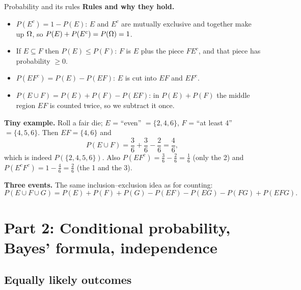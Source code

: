 \begin{key}{Probability and its rules}
	\textbf{Rules and why they hold.}
	\begin{itemize}[nosep]
		\item $P(E^c)=1-P(E)$: $E$ and $E^c$ are mutually exclusive and together
		      make up $\Omega$, so $P(E)+P(E^c)=P(\Omega)=1$.
		\item If $E\subseteq F$ then $P(E)\le P(F)$: $F$ is $E$ plus the piece
		      $FE^c$, and that piece has probability $\ge0$.
		\item $P(EF^c)=P(E)-P(EF)$: $E$ is cut into $EF$ and $EF^c$.
		\item $P(E\cup F)=P(E)+P(F)-P(EF)$: in $P(E)+P(F)$ the middle region
		      $EF$ is counted twice, so we subtract it once.
	\end{itemize}

	\textbf{Tiny example.} Roll a fair die; $E$ = ``even'' $=\{2,4,6\}$,
	$F$ = ``at least 4'' $=\{4,5,6\}$. Then $EF=\{4,6\}$ and
	\[ P(E\cup F)=\frac36+\frac36-\frac26=\frac46, \]
	which is indeed $P(\{2,4,5,6\})$. Also $P(EF^c)=\frac36-\frac26=\frac16$
	(only the 2) and $P(E^cF^c)=1-\frac46=\frac26$ (the 1 and the 3).

	\textbf{Three events.} The same inclusion--exclusion idea as for
	counting:
	\[ P(E\cup F\cup G)=P(E)+P(F)+P(G)-P(EF)-P(EG)-P(FG)+P(EFG). \]
\end{key}


\clearpage
\section{Part 2: Conditional probability, Bayes' formula, independence}

\subsection*{Equally likely outcomes}

